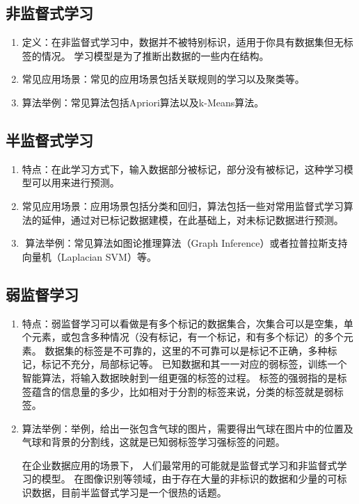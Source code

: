 \subsection{非监督式学习}
\label{ux975eux76d1ux7763ux5f0fux5b66ux4e60}
\begin{enumerate}
\item 定义：在非监督式学习中，数据并不被特别标识，适用于你具有数据集但无标签的情况。
  学习模型是为了推断出数据的一些内在结构。
\item 常见应用场景：常见的应用场景包括关联规则的学习以及聚类等。
\item ​算法举例：常见算法包括Apriori算法以及k-Means算法。
\end{enumerate}

\subsection{半监督式学习}
\label{ux534aux76d1ux7763ux5f0fux5b66ux4e60}
\begin{enumerate}
\item 特点：在此学习方式下，输入数据部分被标记，部分没有被标记，这种学习模型可以用来进行预测。
\item 常见应用场景：应用场景包括分类和回归，算法包括一些对常用监督式学习算法的延伸，通过对已标记数据建模，在此基础上，对未标记数据进行预测。
\item ​ 算法举例：常见算法如图论推理算法（Graph Inference）或者拉普拉斯支持向量机（Laplacian SVM）等。
\end{enumerate}
\subsection{弱监督学习}
\label{ux5f31ux76d1ux7763ux5b66ux4e60}
\begin{enumerate}
\item 特点：弱监督学习可以看做是有多个标记的数据集合，次集合可以是空集，单个元素，或包含多种情况（没有标记，有一个标记，和有多个标记）的多个元素。
  数据集的标签是不可靠的，这里的不可靠可以是标记不正确，多种标记，标记不充分，局部标记等。
已知数据和其一一对应的弱标签，训练一个智能算法，将输入数据映射到一组更强的标签的过程。
标签的强弱指的是标签蕴含的信息量的多少，比如相对于分割的标签来说，分类的标签就是弱标签。
\item 算法举例：举例，给出一张包含气球的图片，需要得出气球在图片中的位置及气球和背景的分割线，这就是已知弱标签学习强标签的问题。

​在企业数据应用的场景下，
人们最常用的可能就是监督式学习和非监督式学习的模型。
在图像识别等领域，由于存在大量的非标识的数据和少量的可标识数据，目前半监督式学习是一个很热的话题。
\end{enumerate}
